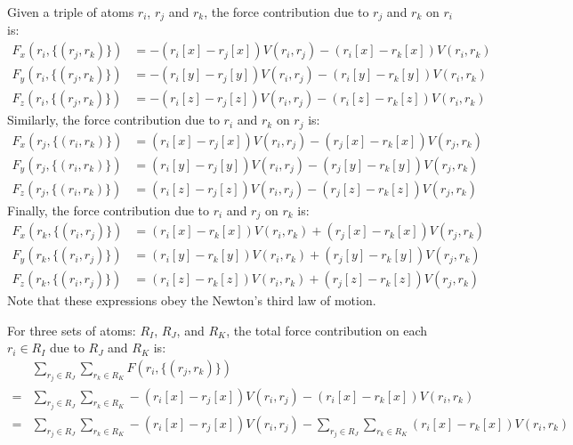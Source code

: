 \documentclass[letterpaper,12pt]{article}
\begin{document}
Given a triple of atoms $r_i$, $r_j$ and $r_k$, the force contribution
due to $r_j$ and $r_k$ on $r_i$ is:
\begin{align*}
F_x(r_i, \{ (r_j, r_k) \}) &= -(r_i[x] - r_j[x]) V(r_i, r_j) - (r_i[x]
- r_k[x]) V(r_i, r_k)\\
F_y(r_i, \{ (r_j, r_k) \}) &= -(r_i[y] - r_j[y]) V(r_i, r_j) - (r_i[y]
- r_k[y]) V(r_i, r_k)\\
F_z(r_i, \{ (r_j, r_k) \}) &= -(r_i[z] - r_j[z]) V(r_i, r_j) - (r_i[z]
- r_k[z]) V(r_i, r_k)
\end{align*}
Similarly, the force contribution due to $r_i$ and $r_k$ on $r_j$ is:
\begin{align*}
F_x(r_j, \{ (r_i, r_k) \}) &= (r_i[x] - r_j[x]) V(r_i, r_j) - (r_j[x]
- r_k[x]) V(r_j, r_k)\\
F_y(r_j, \{ (r_i, r_k) \}) &= (r_i[y] - r_j[y]) V(r_i, r_j) - (r_j[y]
- r_k[y]) V(r_j, r_k)\\
F_z(r_j, \{ (r_i, r_k) \}) &= (r_i[z] - r_j[z]) V(r_i, r_j) - (r_j[z]
- r_k[z]) V(r_j, r_k)
\end{align*}
Finally, the force contribution due to $r_i$ and $r_j$ on $r_k$ is:
\begin{align*}
F_x(r_k, \{ (r_i, r_j) \}) &= (r_i[x] - r_k[x]) V(r_i, r_k) + (r_j[x]
- r_k[x]) V(r_j, r_k)\\
F_y(r_k, \{ (r_i, r_j) \}) &= (r_i[y] - r_k[y]) V(r_i, r_k) + (r_j[y]
- r_k[y]) V(r_j, r_k)\\
F_z(r_k, \{(r_i, r_j) \}) &= (r_i[z] - r_k[z]) V(r_i, r_k) + (r_j[z] -
r_k[z]) V(r_j, r_k)
\end{align*}
Note that these expressions obey the Newton's third law of motion.

For three sets of atoms: $R_I$, $R_J$, and $R_K$, the total force
contribution on each $r_i \in R_I$ due to $R_J$ and $R_K$ is:
\begin{align*}
& \sum\limits_{r_j \in R_J} \sum\limits_{r_k \in R_K} F(r_i, \{ (r_j,
r_k) \}) \\
=& \sum\limits_{r_j \in R_J} \sum\limits_{r_k \in R_K} -(r_i[x] -
r_j[x]) V(r_i, r_j) - (r_i[x] - r_k[x]) V(r_i, r_k)\\
=& \sum\limits_{r_j \in R_J} \sum\limits_{r_k \in R_K} -(r_i[x] -
r_j[x]) V(r_i, r_j) - \sum\limits_{r_j \in R_J} \sum\limits_{r_k \in
  R_K} (r_i[x] - r_k[x]) V(r_i, r_k)\\
\end{align*}
\end{document}
